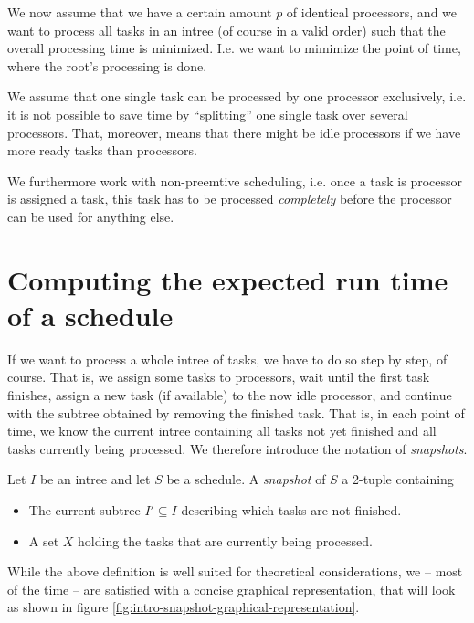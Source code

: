 We now assume that we have a certain amount $p$ of identical processors, and we want to process all tasks in an intree (of course in a valid order) such that the overall processing time is minimized. I.e. we want to mimimize the point of time, where the root's processing is done.

We assume that one single task can be processed by one processor exclusively, i.e. it is not possible to save time by ``splitting'' one single task over several processors. That, moreover, means that there might be idle processors if we have more ready tasks than processors. 

We furthermore work with non-preemtive scheduling, i.e. once a task is processor is assigned a task, this task has to be processed \emph{completely} before the processor can be used for anything else.

\section{Computing the expected run time of a schedule}
\label{sec:introduction-compute-expected-time-schedule}


If we want to process a whole intree of tasks, we have to do so step by step, of course. That is, we assign some tasks to processors, wait until the first task finishes, assign a new task (if available) to the now idle processor, and continue with the subtree obtained by removing the finished task. That is, in each point of time, we know the current intree containing all tasks not yet finished and all tasks currently being processed. We therefore introduce the notation of \emph{snapshots}.

\begin{definition}[Snapshot]
  Let $I$ be an intree and let $S$ be a schedule.
  A \emph{snapshot} of $S$ a 2-tuple containing
  \begin{itemize}
  \item The current subtree $I'\subseteq I$ describing which tasks are not finished.
  \item A set $X$ holding the tasks that are currently being processed.
  \end{itemize}
\end{definition}

While the above definition is well suited for theoretical considerations, we -- most of the time -- are satisfied with a concise graphical representation, that will look as shown in figure \ref{fig:intro-snapshot-graphical-representation}.

